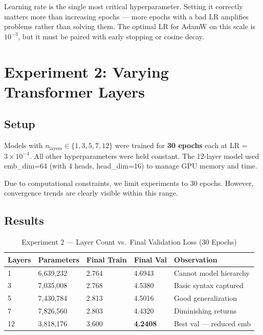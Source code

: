 \documentclass[12pt,a4paper]{article}
\newenvironment{keyinsight}{%
  \begin{tcolorbox}[colback=lightblue!60, colframe=accentblue,
    fonttitle=\bfseries\small\color{navyblue},
    title={Key Insight}, boxrule=0.6pt,
    left=6pt, right=6pt, top=4pt, bottom=4pt]%
}{\end{tcolorbox}}
\begin{document}
\begin{keyinsight}
Learning rate is the single most critical hyperparameter. Setting it correctly matters more than increasing epochs — more epochs with a bad LR amplifies problems rather than solving them. The optimal LR for AdamW on this scale is $10^{-3}$, but it must be paired with early stopping or cosine decay.
\end{keyinsight}

\section{Experiment 2: Varying Transformer Layers}

\subsection{Setup}

Models with $n_{\text{layers}} \in \{1, 3, 5, 7, 12\}$ were trained for \textbf{30 epochs} each at LR = $3\times10^{-4}$. All other hyperparameters were held constant. The 12-layer model used emb\_dim=64 (with 4 heads, head\_dim=16) to manage GPU memory and time.

\begin{keyinsight}
Due to computational constraints, we limit experiments to 30 epochs. However, convergence trends are clearly visible within this range.
\end{keyinsight}

\subsection{Results}

\begin{table}[H]
\centering
\caption{Experiment 2 — Layer Count vs.\ Final Validation Loss (30 Epochs)}
\begin{tabular}{C{1.8cm}C{2.5cm}C{2.8cm}C{2cm}C{3.5cm}}
  \toprule
  \textbf{Layers} & \textbf{Parameters} & \textbf{Final Train} & \textbf{Final Val} & \textbf{Observation} \\
    & 6,639,232 & 2.764 & 4.6943 & Cannot model hierarchy \\
  3  & 7,035,008 & 2.768 & 4.5380 & Basic syntax captured \\
  5  & 7,430,784 & 2.813 & 4.5016 & Good generalization \\
  7  & 7,826,560 & 2.803 & 4.4320 & Diminishing returns \\
  12 & 3,818,176 & 3.600 & \textbf{4.2408} & Best val — reduced emb \\
  \bottomrule
\end{tabular}
\end{table}
\end{document}
